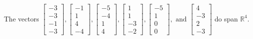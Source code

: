 \begin{exercise}
\begin{exerciseStatement}
  \end{exerciseStatement}
  \begin{exerciseAnswer}
   The vectors \(\left[\begin{array}{r}
-3 \\
-3 \\
-1 \\
-3
\end{array}\right] , \left[\begin{array}{r}
-1 \\
1 \\
4 \\
-4
\end{array}\right] , \left[\begin{array}{r}
-5 \\
-4 \\
1 \\
4
\end{array}\right] , \left[\begin{array}{r}
1 \\
1 \\
-3 \\
-2
\end{array}\right] , \left[\begin{array}{r}
-5 \\
1 \\
0 \\
0
\end{array}\right] , \text{ and } \left[\begin{array}{r}
4 \\
-3 \\
2 \\
-3
\end{array}\right]\) 
  	 do  
	span \(\mathbb{R}^4\).
  


  \end{exerciseAnswer}
\end{exercise}